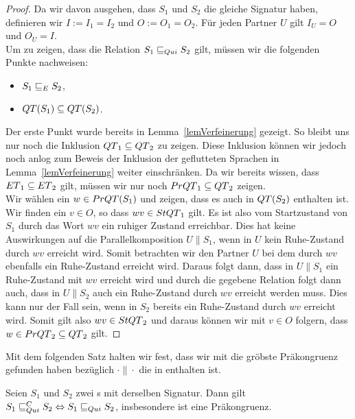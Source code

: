 \begin{proof}
  Da wir davon ausgehen, dass $S_1$ und $S_2$ die gleiche Signatur haben,
  definieren wir $I:=I_1=I_2$ und $O:=O_1=O_2$. Für jeden Partner $U$ gilt
  $I_U=O$ und $O_U=I$.\\
  Um zu zeigen, dass die Relation $S_1\sqsubseteq _{Qui} S_2$ gilt, müssen wir die
  folgenden Punkte nachweisen:
  \begin{itemize}
    \item $S_1\sqsubseteq _E S_2$,
    \item $QT{}(S_1)\subseteq QT{}(S_2)$.
  \end{itemize}
  Der erste Punkt wurde bereits in Lemma~\ref{lemVerfeinerung}
  gezeigt. So bleibt uns nur noch die Inklusion $QT{}_1\subseteq QT{}_2$ zu
  zeigen. Diese Inklusion können wir jedoch noch anlog zum Beweis der Inklusion
  der geflutteten Sprachen in Lemma~\ref{lemVerfeinerung} weiter einschränken.
  Da wir bereits wissen, dass $ET{}_1\subseteq ET{}_2$ gilt, müssen wir nur
  noch $PrQT{}_1\subseteq QT{}_2$ zeigen.\\
  Wir wählen ein $w\in PrQT{}(S_1)$ und zeigen, dass es auch in $QT{}(S_2)$
  enthalten ist.\\
  Wir finden ein $v\in O$, so dass $wv\in StQT{}_1$ gilt. Es ist also vom
  Startzustand von $S_1$ durch das Wort $wv$ ein ruhiger Zustand erreichbar.
  Dies hat keine Auswirkungen auf die Parallelkomposition $U\|S_1$, wenn in $U$
  kein Ruhe-Zustand durch $wv$ erreicht wird. Somit betrachten wir den Partner
  $U$ bei dem durch $wv$ ebenfalls ein Ruhe-Zustand erreicht wird. Daraus folgt
  dann, dass in $U\|S_1$ ein Ruhe-Zustand mit $wv$ erreicht wird und durch die
  gegebene Relation folgt dann auch, dass in $U\|S_2$ auch ein Ruhe-Zustand
  durch $wv$ erreicht werden muss. Dies kann nur der Fall sein, wenn in $S_2$
  bereits ein Ruhe-Zustand durch $wv$ erreicht wird. Somit gilt also $wv\in
  StQT{}_2$ und daraus können wir mit $v\in O$ folgern, dass $w\in
  PrQT{}_2\subseteq QT{}_2$ gilt.
\end{proof}

Mit dem folgenden Satz halten wir fest, dass wir mit \QRel{} die gröbste
Präkongruenz gefunden haben bezüglich $\cdot\|\cdot$ die in \QBRel{} enthalten
ist.

\begin{satz}
  \label{satzQuiFullAbst}
  Seien $S_1$ und $S_2$ zwei \EIO{}s mit derselben Signatur. Dann gilt
  $S_1\sqsubseteq _{Qui}^C S_2\Leftrightarrow S_1\sqsubseteq _{Qui} S_2$, insbesondere ist \QRel{} eine
  Präkongruenz.
\end{satz}

